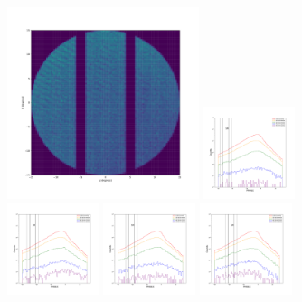 \documentclass[12pt,prd]{article}
\begin{document}
\begin{figure}[h!]
\centering
\includegraphics[width=0.5\textwidth]{../figures/histogram2dgaiascan_l22_5_b74_4_ra209_6_dec23_3_npy.pdf}
\includegraphics[width=0.24\textwidth]{../figures/scanning_plotsgaiascan_l22_5_b74_4_ra209_6_dec23_3_npy_0.pdf}
\includegraphics[width=0.24\textwidth]{../figures/scanning_plotsgaiascan_l22_5_b74_4_ra209_6_dec23_3_npy_1.pdf}
\includegraphics[width=0.24\textwidth]{../figures/scanning_plotsgaiascan_l22_5_b74_4_ra209_6_dec23_3_npy_2.pdf}
\includegraphics[width=0.24\textwidth]{../figures/scanning_plotsgaiascan_l22_5_b74_4_ra209_6_dec23_3_npy_3.pdf}

\end{figure}
\end{document}
